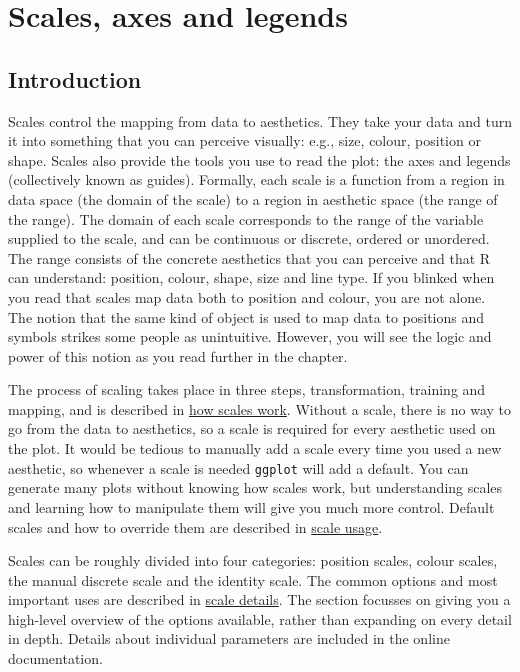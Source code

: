 \chapter{Scales, axes and legends}\label{cha:scales}

\section{Introduction}

Scales control the mapping from data to aesthetics. They take your data
and turn it into something that you can perceive visually: e.g., size,
colour, position or shape. Scales also provide the tools you use to read
the plot: the axes and legends (collectively known as guides). Formally,
each scale is a function from a region in data space (the domain of the
scale) to a region in aesthetic space (the range of the range). The
domain of each scale corresponds to the range of the variable supplied
to the scale, and can be continuous or discrete, ordered or unordered.
The range consists of the concrete aesthetics that you can perceive and
that R can understand: position, colour, shape, size and line type. If
you blinked when you read that scales map data both to position and
colour, you are not alone. The notion that the same kind of object is
used to map data to positions and symbols strikes some people as
unintuitive. However, you will see the logic and power of this notion as
you read further in the chapter.

The process of scaling takes place in three steps, transformation,
training and mapping, and is described in
\hyperref[sec:how-scales-work]{how scales work}. Without a scale, there
is no way to go from the data to aesthetics, so a scale is required for
every aesthetic used on the plot. It would be tedious to manually add a
scale every time you used a new aesthetic, so whenever a scale is needed
\texttt{ggplot} will add a default. You can generate many plots without
knowing how scales work, but understanding scales and learning how to
manipulate them will give you much more control. Default scales and how
to override them are described in \hyperref[sec:scale-usage]{scale
usage}.

Scales can be roughly divided into four categories: position scales,
colour scales, the manual discrete scale and the identity scale. The
common options and most important uses are described in
\hyperref[sec:scale-details]{scale details}. The section focusses on
giving you a high-level overview of the options available, rather than
expanding on every detail in depth. Details about individual parameters
are included in the online documentation.

